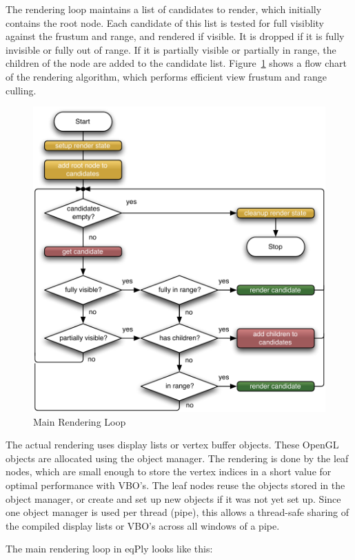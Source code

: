 \documentclass[10pt,a4]{scrartcl}
\newcommand{\fig}[1]{Figure~\ref{#1}}
\begin{document}
The rendering loop maintains a list of candidates to render, which
initially contains the root node. Each candidate of this list is tested
for full visiblity against the frustum and range, and rendered if
visible. It is dropped if it is fully invisible or fully out of
range. If it is partially visible or partially in range, the children of
the node are added to the candidate list. \fig{fRender} shows a flow
chart of the rendering algorithm, which performs efficient view frustum
and range culling.

\begin{figure}
  \includegraphics[width=.618\textwidth]{images/render.pdf}
  {\caption{\small\label{fRender}Main Rendering Loop}}
\end{figure}
The actual rendering uses display lists or vertex buffer objects. These
OpenGL objects are allocated using the object manager. The rendering is
done by the leaf nodes, which are small enough to store the vertex
indices in a \textsf{short} value for optimal performance with VBO's.
The leaf nodes reuse the objects stored in the object manager, or create
and set up new objects if it was not yet set up. Since one object
manager is used per thread (pipe), this allows a thread-safe sharing of
the compiled display lists or VBO's across all windows of a pipe.

The main rendering loop in \textsf{eqPly} looks like this:
\end{document}
